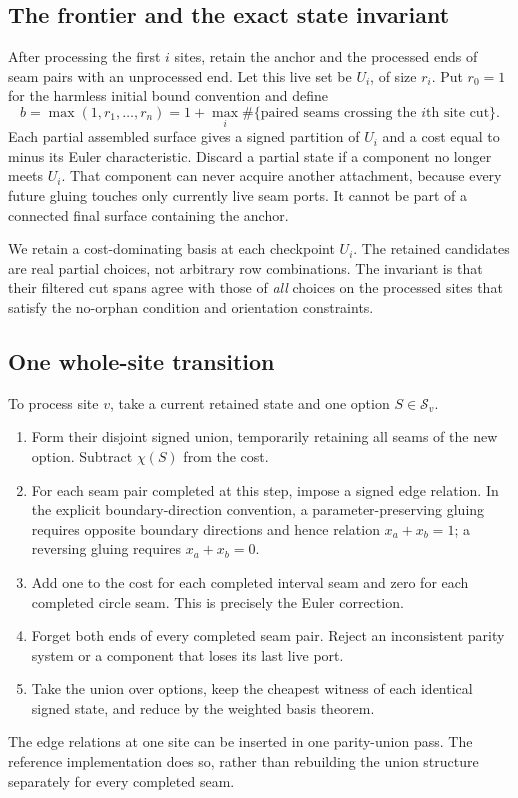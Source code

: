 \documentclass[11pt,letterpaper]{article}
\theoremstyle{definition}
\begin{document}
\subsection{The frontier and the exact state invariant}
After processing the first $i$ sites, retain the anchor and the processed ends of seam pairs with an unprocessed end. Let this live set be $U_i$, of size $r_i$. Put $r_0=1$ for the harmless initial bound convention and define
\begin{equation}\label{eq:frontier-width}
 b=\max(1,r_1,\ldots,r_n)
   =1+\max_i\#\{\text{paired seams crossing the }i\text{th site cut}\}.
\end{equation}
Each partial assembled surface gives a signed partition of $U_i$ and a cost equal to minus its Euler characteristic. Discard a partial state if a component no longer meets $U_i$. That component can never acquire another attachment, because every future gluing touches only currently live seam ports. It cannot be part of a connected final surface containing the anchor.

We retain a cost-dominating basis at each checkpoint $U_i$. The retained candidates are real partial choices, not arbitrary row combinations. The invariant is that their filtered cut spans agree with those of \emph{all} choices on the processed sites that satisfy the no-orphan condition and orientation constraints.

\subsection{One whole-site transition}
To process site $v$, take a current retained state and one option $S\in\mathcal S_v$.
\begin{enumerate}
\item Form their disjoint signed union, temporarily retaining all seams of the new option. Subtract $\chi(S)$ from the cost.
\item For each seam pair completed at this step, impose a signed edge relation. In the explicit boundary-direction convention, a parameter-preserving gluing requires opposite boundary directions and hence relation $x_a+x_b=1$; a reversing gluing requires $x_a+x_b=0$.
\item Add one to the cost for each completed interval seam and zero for each completed circle seam. This is precisely the Euler correction.
\item Forget both ends of every completed seam pair. Reject an inconsistent parity system or a component that loses its last live port.
\item Take the union over options, keep the cheapest witness of each identical signed state, and reduce by the weighted basis theorem.
\end{enumerate}
The edge relations at one site can be inserted in one parity-union pass. The reference implementation does so, rather than rebuilding the union structure separately for every completed seam.
\end{document}
